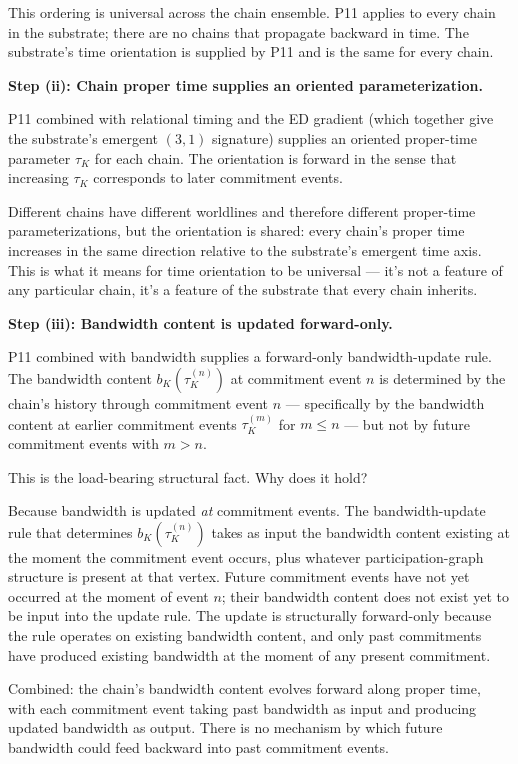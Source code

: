 \documentclass[11pt,a4paper]{article}
\begin{document}
This ordering is universal across the chain ensemble. P11 applies to every chain in the substrate; there are no chains that propagate backward in time. The substrate's time orientation is supplied by P11 and is the same for every chain.

\textbf{Step (ii): Chain proper time supplies an oriented parameterization.}

P11 combined with relational timing and the ED gradient (which together give the substrate's emergent $(3,1)$ signature) supplies an oriented proper-time parameter $\tau_K$ for each chain. The orientation is forward in the sense that increasing $\tau_K$ corresponds to later commitment events.

Different chains have different worldlines and therefore different proper-time parameterizations, but the orientation is shared: every chain's proper time increases in the same direction relative to the substrate's emergent time axis. This is what it means for time orientation to be universal --- it's not a feature of any particular chain, it's a feature of the substrate that every chain inherits.

\textbf{Step (iii): Bandwidth content is updated forward-only.}

P11 combined with bandwidth supplies a forward-only bandwidth-update rule. The bandwidth content $b_K(\tau_K^{(n)})$ at commitment event $n$ is determined by the chain's history through commitment event $n$ --- specifically by the bandwidth content at earlier commitment events $\tau_K^{(m)}$ for $m \leq n$ --- but not by future commitment events with $m > n$.

This is the load-bearing structural fact. Why does it hold?

Because bandwidth is updated \emph{at} commitment events. The bandwidth-update rule that determines $b_K(\tau_K^{(n)})$ takes as input the bandwidth content existing at the moment the commitment event occurs, plus whatever participation-graph structure is present at that vertex. Future commitment events have not yet occurred at the moment of event $n$; their bandwidth content does not exist yet to be input into the update rule. The update is structurally forward-only because the rule operates on existing bandwidth content, and only past commitments have produced existing bandwidth at the moment of any present commitment.

Combined: the chain's bandwidth content evolves forward along proper time, with each commitment event taking past bandwidth as input and producing updated bandwidth as output. There is no mechanism by which future bandwidth could feed backward into past commitment events.
\end{document}
